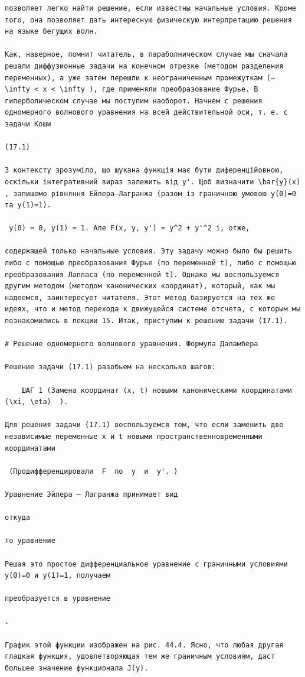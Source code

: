 \documentclass[
  ukrainian,
]{article}
\begin{document}
\begin{verbatim}
позволяет легко найти решение, если известны начальные условия. Кроме того, она позволяет дать интересную физическую интерпретацию решения на языке бегущих волн.

Как, наверное, помнит читатель, в параболническом случае мы сначала решали диффузионные задачи на конечном отрезке (методом разделения переменных), а уже затем перешли к неограниченным промежуткам (—  \infty < x < \infty ), где применяли преобразование Фурье. В гиперболическом случае мы поступим наоборот. Начнем с решения одномерного волнового уравнения на всей действительной оси, т. е. с задачи Коши

(17.1)

З контексту зрозуміло, що шукана функція має бути диференційовною, оскільки інтегративний вираз залежить від y'. Щоб визначити \bar{y}(x) , запишемо рівняння Ейлера–Лагранжа (разом із граничною умовою y(0)=0 та y(1)=1).

 y(0) = 0, y(1) = 1. Але F(x, y, y') = y^2 + y'^2 і, отже,

содержащей только начальные условия. Эту задачу можно было бы решить либо с помощью преобразования Фурье (по переменной t), либо с помощью преобразования Лапласа (по переменной t). Однако мы воспользуемся другим методом (методом канонических координат), который, как мы надеемся, заинтересует читателя. Этот метод базируется на тех же идеях, что и метод перехода к движущейся системе отсчета, с которым мы познакомились в лекции 15. Итак, приступим к решению задачи (17.1).

# Решение одномерного волнового уравнения. Формула Даламбера

Решение задачи (17.1) разобьем на несколько шагов:

    ШАГ 1 (Замена координат (x, t) новыми каноническими координатами   (\xi, \eta)  ).

Для решения задачи (17.1) воспользуемся тем, что если заменить две независимые переменные x и t новыми пространственновременными координатами

 (Продифференцировали  F  по  y  и  y'. )

Уравнение Эйлера — Лагранжа принимает вид

откуда

то уравнение

Решая это простое дифференциальное уравнение с граничными условиями y(0)=0 и y(1)=1, получаем

преобразуется в уравнение

.

График этой функции изображен на рис. 44.4. Ясно, что любая другая гладкая функция, удовлетворяющая тем же граничным условиям, даст большее значение функционала J(y).


\end{verbatim}
\end{document}
